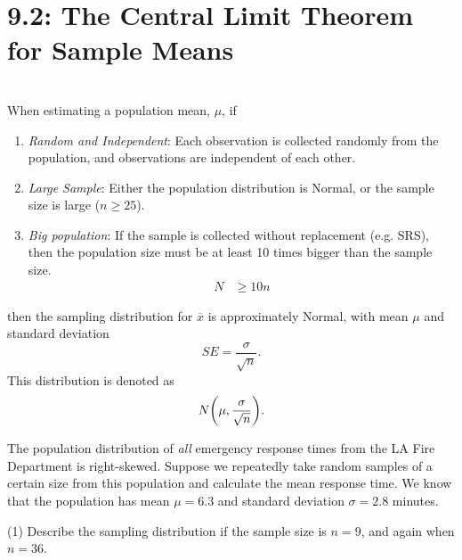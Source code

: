 \documentclass[../mathNotesPreamble]{subfiles}
\providecommand{\relscalefact}{1.4}
\begin{document}
\relscale{\relscalefact}
  \section{9.2: The Central Limit Theorem for Sample Means}

  \begin{defn*}\mbox{}\\
    When estimating a population mean, $\mu$, if
    \begin{enumerate}
      \item \emph{Random and Independent}: Each observation is collected randomly from the population, and observations are independent of each other.
      \item \emph{Large Sample}: Either the population distribution is Normal, or the sample size is large ($n\geq 25$).
      \item \emph{Big population}: If the sample is collected without replacement (e.g. SRS), then the population size must be at least 10 times bigger than the sample size.
        \begin{align*}
          N&\geq 10n
        \end{align*}
    \end{enumerate}
    then the sampling distribution for $\overline{x}$ is approximately Normal, with mean $\mu$ and standard deviation
      \[SE=\frac{\sigma}{\sqrt{n}}.\]
    This distribution is denoted as
      \[N{\left(\mu,\frac{\sigma}{\sqrt{n}}\right)}.\]
  \end{defn*}
  \pagebreak

  \begin{ex*}
    The population distribution of \emph{all} emergency response times from the LA Fire Department is right-skewed. Suppose we repeatedly take random samples of a certain size from this population and calculate the mean response time. We know that the population has mean $\mu=6.3$ and standard deviation $\sigma=2.8$ minutes.
  \end{ex*}
  \begin{extasks}[after-item-skip=\stretch{1}](1)
    \task Describe the sampling distribution if the sample size is $n=9$, and again when $n=36$.
  \end{extasks}
  \vspace*{\baselineskip}
\end{document}
